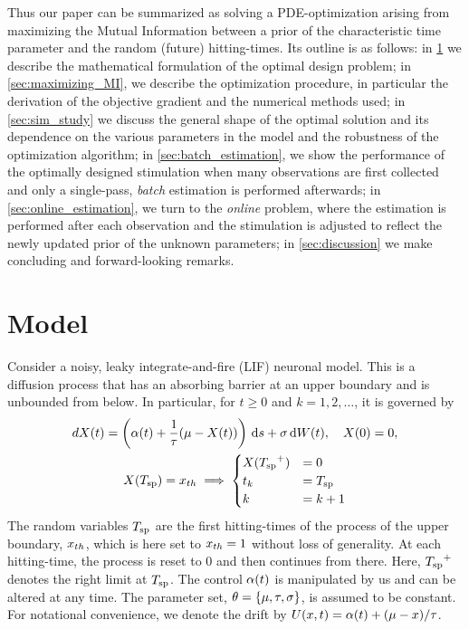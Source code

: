 \documentclass{article}
\begin{document}
Thus our paper can be summarized as solving a PDE-optimization arising from
maximizing the Mutual Information between a prior of the characteristic time
parameter and the random (future) hitting-times. Its outline is as  follows:  in
\cref{sec:problem_formulation} we describe the mathematical formulation of the optimal design problem; in
\cref{sec:maximizing_MI}, we describe the optimization procedure, in particular
the derivation of the objective gradient and the numerical methods used; in 
\cref{sec:sim_study} we discuss the general shape of the optimal solution and
its dependence on the various parameters in the model and the robustness of the
optimization algorithm; in \cref{sec:batch_estimation}, we show the performance
of the optimally designed stimulation when many observations are first collected and only a single-pass,
{\sl batch} estimation is performed afterwards; in \cref{sec:online_estimation},
we turn to the {\sl online} problem, where the estimation is performed
after each observation and the stimulation is adjusted to reflect the newly
updated prior of the unknown parameters; in \cref{sec:discussion} we make
concluding and forward-looking remarks. 
 
\section{Model}
\label{sec:problem_formulation}
Consider a noisy, leaky integrate-and-fire
(LIF) neuronal model. This is a diffusion process that has an absorbing barrier
at an upper boundary and is unbounded from below. In particular, for
$t \geq 0$ and $k=1,2,\ldots$, it is governed by
\begin{equation}
\begin{gathered}
dX(t) = \left(\a(t) + \frac 1\tc(\m %
 - {X(t)} ) \right) \intd{s} + \s\intd{W(t)},
\quad X(0) = 0,
\\
X(\ts) = \xth \implies  
\begin{cases}  
X(\ts^+) &= 0   
\\
t_k &=  \ts
\\
k  &= k+1
\end{cases}
\end{gathered} 
\label{eq:X_evolution_uo_control}
\end{equation}
The random variables ${ T_{\textrm{sp} } }$ are the first hitting-times of the process of the upper
boundary, ${ x_{th} }$, which is here set to ${ x_{th} }=1$ without loss of generality. At each hitting-time,
the process is reset to $0$ and then continues from there. Here,
${ T_{\textrm{sp} } }^+$ denotes the right limit at ${ T_{\textrm{sp} } }$. The control 
${\alpha}(t)$ is manipulated by us and can be altered at any
time. The parameter set,
${\theta} = \{{\mu }, { \tau }, {\sigma }\}$, is assumed to be constant. For notational
convenience, we denote the drift by $U(x,t)={\alpha}(t) + ({\mu }  - x )/{ \tau }$.
\end{document}
